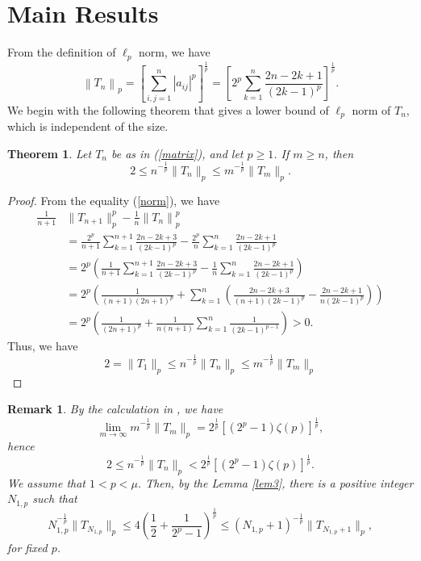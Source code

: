 \documentclass{amsart}
\newtheorem{theorem}{Theorem}
\newtheorem{remark}{Remark}
\begin{document}
\section{Main Results}
From the definition of $\ell_p$ norm, we have
\begin{equation}\label{norm}
\left\|T_n\right\|_p=\left[\sum_{i, j=1}^n\left|a_{i j}\right|^p\right]^{\frac{1}{p}}=\left[2^p \sum_{k=1}^n \frac{2 n-2 k+1}{(2 k-1)^p}\right]^{\frac{1}{p}}.
\end{equation}
We begin with the following theorem that gives a lower bound of $\ell_p$ norm of $T_n$, which is independent of the size. 
\begin{theorem}\label{thm1}
Let $T_n$ be as in (\ref{matrix}), and let $p\geq1$. If $m\geq n$, then
\begin{equation}\label{generalineq1}
   2\leq n^{-\frac{1}{p}}\|T_n\|_{p}\leq m^{-\frac{1}{p}}\|T_m\|_{p}.
\end{equation}
\end{theorem}
\begin{proof} From the equality (\ref{norm}), we have
\begin{align*}
\frac{1}{n+1}&\|T_{n+1}\|_p^p-\frac{1}{n}\left\|T_{n}\right\|_p^p\\
&=\frac{2^p}{n+1}\sum_{k=1}^{n+1}\frac{2n-2k+3}{(2k-1)^p}-\frac{2^p}{n}\sum_{k=1}^{n}\frac{2n-2k+1}{(2k-1)^p}\\
&=2^p\left(\frac{1}{n+1}\sum_{k=1}^{n+1}\frac{2n-2k+3}{(2k-1)^p}-\frac{1}{n}\sum_{k=1}^{n}\frac{2n-2k+1}{(2k-1)^p}\right)\\
&=2^p\left(\frac{1}{(n+1)(2n+1)^p}+\sum_{k=1}^n\left(\frac{2n-2k+3}{(n+1)(2k-1)^p}-\frac{2n-2k+1}{n(2k-1)^p}\right)\right)\\
&=2^p\left(\frac{1}{(2n+1)^p}+\frac{1}{n(n+1)}\sum_{k=1}^n\frac{1}{(2k-1)^{p-1}}\right)>0.
\end{align*}
Thus, we have
$$2= \|T_1\|_{p}\leq n^{-\frac{1}{p}}\|T_n\|_{p}\leq m^{-\frac{1}{p}}\|T_m\|_{p}$$
\end{proof}
\begin{remark}\label{rem1}
    By the calculation in \cite{bozkurt1}, we have
$$\lim_{m\to\infty}m^{-\frac{1}{p}}\|T_m\|_{p}=2^{\frac{1}{p}}\left[(2^p-1)\zeta(p)\right]^{\frac{1}{p}},$$
hence 
$$  2\leq n^{-\frac{1}{p}}\|T_n\|_{p}<2^{\frac{1}{p}}\left[(2^p-1)\zeta(p)\right]^{\frac{1}{p}}.$$
We assume that $1<p<\mu$. Then, by the Lemma \ref{lem3}, there is a positive integer $N_{1,p}$ such that
$$N_{1,p}^{-\frac{1}{p}}\|T_{N_{1,p}}\|_{p}\leq 4\left(\frac{1}{2}+\frac{1}{2^p-1}\right)^{\frac{1}{p}}\leq (N_{1,p}+1)^{-\frac{1}{p}}\|T_{N_{1,p}+1}\|_{p},$$
for fixed $p$.
\end{remark}
\end{document}
